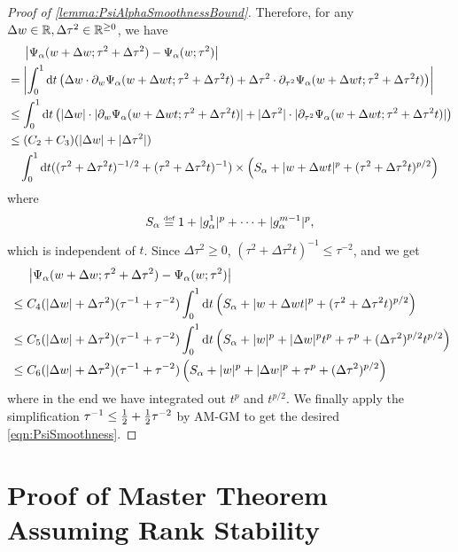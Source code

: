 \documentclass[main.tex]{subfiles}
\begin{document}
\begin{proof}[Proof of \cref{lemma:PsiAlphaSmoothnessBound}]
Therefore, for any $\Delta w \in \mathbb{R}, \Delta \tau^2 \in \mathbb{R}^{\ge 0}$, we have
\begin{align*}
&\phantomeq
    \left| \Psi_\alpha(w+\Delta w; \tau^2 + \Delta \tau^2) - \Psi_\alpha(w; \tau^2)\right|
    \\
&=
    \left|
    \int_0^1 \dd t \lp 
        \Delta w \cdot \pd_w \Psi_\alpha(w + \Delta w t; \tau^2 + \Delta \tau^2 t) +
        \Delta \tau^2 \cdot \pd_{\tau^2} \Psi_\alpha(w + \Delta w t; \tau^2 + \Delta \tau^2 t)
        \rp
    \right|
    \\
&\le
    \int_0^1 \dd t \lp 
        |\Delta w| \cdot |\pd_w \Psi_\alpha(w + \Delta w t; \tau^2 + \Delta \tau^2 t)| +
        |\Delta \tau^2| \cdot |\pd_{\tau^2} \Psi_\alpha(w + \Delta w t; \tau^2 + \Delta \tau^2 t)|
        \rp
    \\
&\le
    (C_2 + C_3)
    (|\Delta w| + |\Delta \tau^2|)
    \\
&\quad
    \int_0^1 \dd t
        ((\tau^2 + \Delta \tau^2 t)^{-1/2} + (\tau^2 + \Delta \tau^2 t)^{-1})
        \times
        \lp S_\alpha + |w+\Delta w t|^p + (\tau^2 + \Delta\tau^2 t)^{p/2} \rp
\end{align*}
where
\[S_\alpha \defeq 1 + |g^1_\alpha|^{p} + \cdots + |g^{\MM-1}_\alpha|^p,\]
which is independent of $t$.
Since $\Delta \tau^2 \ge 0$, $(\tau^2 + \Delta \tau^2 t)^{-1} \le \tau^{-2}$, and we get
\begin{align*}
&\phantomeq
    \left| \Psi_\alpha(w+\Delta w; \tau^2 + \Delta \tau^2) - \Psi_\alpha(w; \tau^2)\right|
    \\
&\le
    C_4
    (|\Delta w| + \Delta \tau^2)
    (\inv \tau + \tau^{-2})
    \int_0^1 \dd t
        \lp S_\alpha + |w+\Delta w t|^p + (\tau^2 + \Delta\tau^2 t)^{p/2} \rp
    \\
&\le
    C_5
    (|\Delta w| + \Delta \tau^2)
    (\inv \tau + \tau^{-2})
    \int_0^1 \dd t
        \lp S_\alpha + |w|^p + |\Delta w|^p t^p + \tau^p + (\Delta\tau^2)^{p/2} t^{p/2} \rp
    \\
&\le
    C_6
    (|\Delta w| + \Delta \tau^2)
    (\inv \tau + \tau^{-2})
        \lp S_\alpha + |w|^p + |\Delta w|^p + \tau^p + (\Delta\tau^2)^{p/2} \rp
\end{align*}
where in the end we have integrated out $t^p$ and $t^{p/2}$.
We finally apply the simplification $\tau^{-1} \le \frac{1}{2} + \frac{1}{2} \tau^{-2}$ by AM-GM to get the desired \cref{eqn:PsiSmoothness}.
\end{proof}

\section{Proof of \texorpdfstring{\netsortplus{}}{NetsorT+} Master Theorem Assuming Rank Stability}
\end{document}
